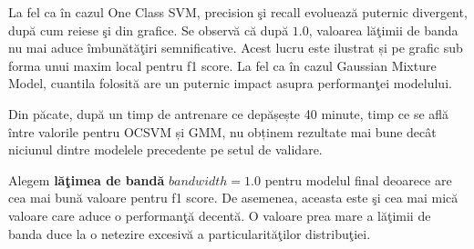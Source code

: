 La fel ca în cazul One Class SVM, precision şi recall evoluează puternic
divergent, după cum reiese şi din grafice. 
Se observă că după $1.0$, valoarea lăţimii de banda nu mai aduce îmbunătăţiri 
semnificative. Acest lucru este ilustrat și pe grafic sub forma unui maxim local 
pentru f1 score. La fel ca în cazul Gaussian Mixture Model, cuantila 
folosită are un puternic impact asupra performanţei modelului.

Din păcate, după un timp de antrenare ce depășește 40 minute, 
timp ce se află între valorile pentru OCSVM și GMM, nu obținem 
rezultate mai bune decât niciunul dintre modelele precedente
pe setul de validare. 

Alegem \textbf{lăţimea de bandă} $bandwidth=1.0$ pentru modelul final deoarece are cea
mai bună valoare pentru f1 score. De asemenea, aceasta este şi cea mai mică valoare 
care aduce o performanţă decentă. O valoare prea mare a lăţimii de banda duce 
la o netezire excesivă a particularităţilor distribuţiei.

